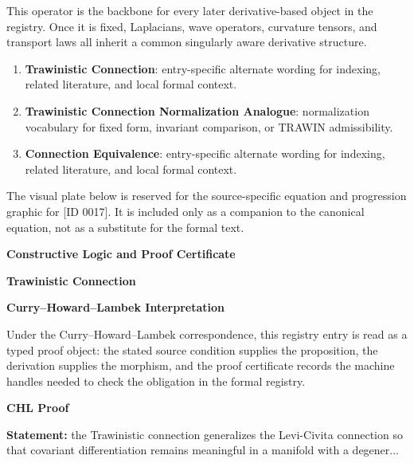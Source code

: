 This operator is the backbone for every later derivative-based object in the registry. Once it is fixed, Laplacians, wave operators, curvature tensors, and transport laws all inherit a common singularly aware derivative structure.
\endgroup

\begingroup\footnotesize\sloppy
\begin{enumerate}[leftmargin=1.35em,itemsep=1pt,topsep=1pt,parsep=0pt]
\item \textbf{Trawinistic Connection}: entry-specific alternate wording for indexing, related literature, and local formal context.
\item \textbf{Trawinistic Connection Normalization Analogue}: normalization vocabulary for fixed form, invariant comparison, or TRAWIN admissibility.
\item \textbf{Connection Equivalence}: entry-specific alternate wording for indexing, related literature, and local formal context.
\end{enumerate}
\endgroup

\begingroup\footnotesize\sloppy
The visual plate below is reserved for the source-specific equation and progression graphic for [ID 0017]. It is included only as a companion to the canonical equation, not as a substitute for the formal text.
\par\endgroup
\ifTZPDarkEdition
{}
\fi

\clearpage
\begingroup\tzpsupportsetup
\noindent\textbf{\fontsize{10.8pt}{12.8pt}\selectfont [ID 0017] Constructive Logic and Proof Certificate}\par
\noindent\textbf{\fontsize{10pt}{12pt}\selectfont Trawinistic Connection}\par
\vspace{0.45em}
\begingroup
\footnotesize
\setlength{\parskip}{0.22em}
\setlength{\parindent}{0pt}
\noindent\textbf{Curry--Howard--Lambek Interpretation}\par
Under the Curry--Howard--Lambek correspondence, this registry entry is read as a typed proof
object: the stated source condition supplies the proposition, the derivation supplies the
morphism, and the proof certificate records the machine handles needed to check the obligation
in the formal registry.

\vspace{0.45em}
\noindent\textbf{CHL Proof}\par
\textbf{Statement:} the Trawinistic connection generalizes the Levi-Civita connection so that covariant
differentiation remains meaningful in a manifold with a degener...

